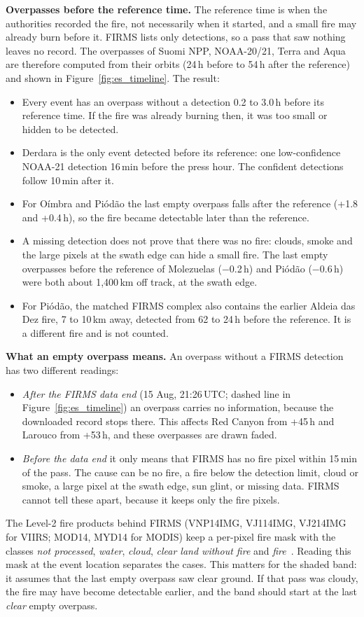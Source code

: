 \documentclass[11pt]{article}
\begin{document}
\textbf{Overpasses before the reference time.} The reference time is when the authorities recorded the fire, not necessarily when it started, and a small fire may already burn before it. FIRMS lists only detections, so a pass that saw nothing leaves no record. The overpasses of Suomi NPP, NOAA-20/21, Terra and Aqua are therefore computed from their orbits (24\,h before to 54\,h after the reference) and shown in Figure~\ref{fig:es_timeline}. The result:
\begin{itemize}[leftmargin=1.2cm]
    \item Every event has an overpass without a detection 0.2 to 3.0\,h before its reference time. If the fire was already burning then, it was too small or hidden to be detected.
    \item Derdara is the only event detected before its reference: one low-confidence NOAA-21 detection 16\,min before the press hour. The confident detections follow 10\,min after it.
    \item For O\'imbra and Pi\'od\~ao the last empty overpass falls after the reference (+1.8 and +0.4\,h), so the fire became detectable later than the reference.
    \item A missing detection does not prove that there was no fire: clouds, smoke and the large pixels at the swath edge can hide a small fire. The last empty overpasses before the reference of Molezuelas ($-$0.2\,h) and Pi\'od\~ao ($-$0.6\,h) were both about 1,400\,km off track, at the swath edge.
    \item For Pi\'od\~ao, the matched FIRMS complex also contains the earlier Aldeia das Dez fire, 7 to 10\,km away, detected from 62 to 24\,h before the reference. It is a different fire and is not counted.
\end{itemize}

\textbf{What an empty overpass means.} An overpass without a FIRMS detection has two different readings:
\begin{itemize}[leftmargin=1.2cm]
    \item \emph{After the FIRMS data end} (15 Aug, 21:26\,UTC; dashed line in Figure~\ref{fig:es_timeline}) an overpass carries no information, because the downloaded record stops there. This affects Red Canyon from +45\,h and Larouco from +53\,h, and these overpasses are drawn faded.
    \item \emph{Before the data end} it only means that FIRMS has no fire pixel within 15\,min of the pass. The cause can be no fire, a fire below the detection limit, cloud or smoke, a large pixel at the swath edge, sun glint, or missing data. FIRMS cannot tell these apart, because it keeps only the fire pixels.
\end{itemize}
The Level-2 fire products behind FIRMS (VNP14IMG, VJ114IMG, VJ214IMG for VIIRS; MOD14, MYD14 for MODIS) keep a per-pixel fire mask with the classes \emph{not processed}, \emph{water}, \emph{cloud}, \emph{clear land without fire} and \emph{fire}~\cite{schroeder2014viirs, giglio2016modis}. Reading this mask at the event location separates the cases. This matters for the shaded band: it assumes that the last empty overpass saw clear ground. If that pass was cloudy, the fire may have become detectable earlier, and the band should start at the last \emph{clear} empty overpass.
\end{document}

